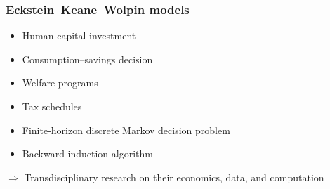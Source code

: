 \begin{frame}\frametitle{Eckstein--Keane--Wolpin models}

\begin{multicols}{2}

	\vspace{0.3cm}
	\begin{itemize}\setlength\itemsep{1em}
		\item Human capital investment
		\item Consumption--savings decision
	\end{itemize}

    \pause

	\vspace{0.3cm}
	\begin{itemize}\setlength\itemsep{1em}
		\item Welfare programs
		\item Tax schedules
	\end{itemize}

\end{multicols}

 \pause
{}\vspace{0.3cm}
\begin{itemize}\setlength\itemsep{1em}
	\item Finite-horizon discrete Markov decision problem
	\item Backward induction algorithm
\end{itemize}


\pause

\hspace{0.3cm}$\Rightarrow$ Transdisciplinary research on their \alert<4>{economics}, \alert<5>{data}, and \alert<6>{computation}

\end{frame}

